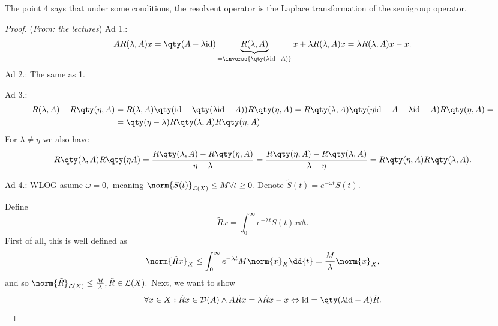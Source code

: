 \begin{remark}
    The point 4 says that under some conditions, the resolvent operator is the Laplace transformation of the semigroup operator.
\end{remark}

\begin{proof}(\textit{From: the lectures})
    Ad 1.: 
    \[
	    A R(\lambda, A)x = \qty(A- \lambda \text{id})\underbrace{R(\lambda, A)}_{ = \inverse{\qty(\lambda \text{id}-A)}}x + \lambda R(\lambda, A)x = \lambda R(\lambda, A)x - x.
    \]
    Ad 2.:
    The same as 1.

    Ad 3.:
    \begin{align*}
	    R(\lambda, A) - R\qty(\eta, A) &= R(\lambda, A)\qty(\text{id} - \qty(\lambda \text{id} - A))R\qty(\eta,A) = R\qty(\lambda,A)\qty(\eta \text{id} - A - \lambda \text{id} +A)R\qty(\eta,A) =\\
	    &=\qty(\eta - \lambda)R\qty(\lambda, A)R\qty(\eta,A)
    \end{align*}
    For $\lambda \neq \eta$ we also have
    \[
	    R\qty(\lambda,A) R\qty(\eta A) = \frac{R\qty(\lambda,A)-R\qty(\eta,A)}{\eta-\lambda} = \frac{R\qty(\eta,A)-R\qty(\lambda, A)}{\lambda-\eta} = R\qty(\eta,A) R\qty(\lambda,A).
    \]


    Ad 4.:
    WLOG asume $\omega = 0,$ meaning $\norm{S(t)}_{\mathcal{L}(X)}\leq M \forall t \geq 0.$ Denote $\tilde{S}(t) = e^{- \omega t}S(t).$



    Define
    \[
	    \tilde{R}x = \int_0^\infty e^{-\lambda t}S(t)x \dd{t}.
    \]
    First of all, this is well defined as
    \[
	    \norm{\tilde{R}x}_X \leq \int_0^{\infty}e^{-\lambda t}M \norm{x}_X \dd{t} = \frac{M}{\lambda}\norm{x}_X,
    \]
    and so $\norm{\tilde{R}}_{\mathcal{L}(X)} \leq \frac{M}{\lambda}, \tilde{R} \in \mathcal{L}(X).$ Next, we want to show
    \[
	    \forall x \in X: \tilde{R}x \in \mathcal{D}(A) \wedge A \tilde{R}x = \lambda \tilde{R}x -x \Leftrightarrow \text{id} = \qty(\lambda \text{id}-A)\tilde{R}.
    \]



\end{proof}
